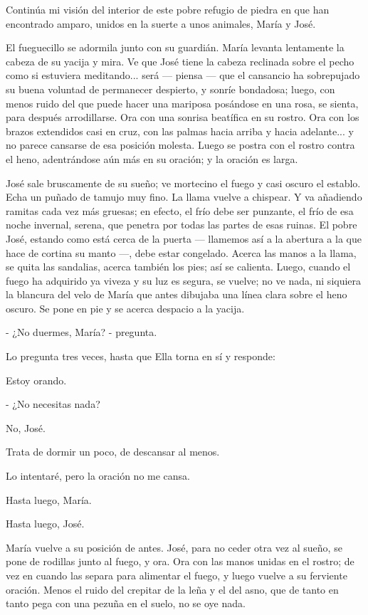 \documentclass[12pt]{book} %
\begin{document}
Continúa mi visión del interior de este pobre refugio de piedra en que han encontrado amparo, unidos en la suerte a  unos animales, María y José. 

El fueguecillo se adormila junto con su guardián. María levanta lentamente la cabeza de su yacija y mira. Ve que José tiene la cabeza reclinada sobre el pecho como si estuviera meditando... será — piensa — que el cansancio ha sobrepujado su buena voluntad de permanecer despierto, y sonríe bondadosa; luego, con menos ruido del que puede hacer una mariposa posándose en una rosa, se sienta, para después arrodillarse. Ora con una sonrisa beatífica en su rostro. Ora con los brazos extendidos casi en cruz, con las palmas hacia arriba y hacia adelante... y no parece cansarse de esa posición molesta. Luego se postra con el rostro contra el heno, adentrándose aún más en su oración; y la oración es larga. 

José sale bruscamente de su sueño; ve mortecino el fuego y casi oscuro el establo. Echa un puñado de tamujo muy fino. La llama vuelve a chispear. Y va añadiendo ramitas cada vez más gruesas; en efecto, el frío debe ser punzante, el frío de esa noche invernal, serena, que penetra por todas las partes de esas ruinas. El pobre José, estando como está cerca de la puerta — llamemos así a la abertura a la que hace de cortina su manto —, debe estar congelado. Acerca las manos a la llama, se quita las sandalias, acerca también los pies; así se calienta. Luego, cuando el fuego ha adquirido ya viveza y su luz es segura, se vuelve; no ve nada, ni siquiera la blancura del velo de María que antes dibujaba una línea clara sobre el heno oscuro. Se pone en pie y se acerca despacio a la yacija. 

- ¿No duermes, María? - pregunta. 

Lo pregunta tres veces, hasta que Ella torna en sí y responde: 

Estoy orando. 

- ¿No necesitas nada? 

No, José. 

Trata de dormir un poco, de descansar al menos. 

Lo intentaré, pero la oración no me cansa. 

Hasta luego, María. 

Hasta luego, José. 

María vuelve a su posición de antes. José, para no ceder otra vez al sueño, se pone de rodillas junto al fuego, y ora. Ora con las manos unidas en el rostro; de vez en cuando las separa para alimentar el fuego, y luego vuelve a su ferviente oración. Menos el ruido del crepitar de la leña y el del asno, que de tanto en tanto pega con una pezuña en el suelo, no se oye nada. 
\end{document}
